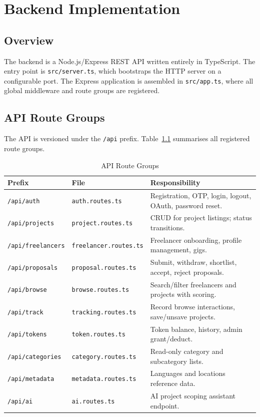 \chapter{Backend Implementation}

\section{Overview}

The \projectname{} backend is a Node.js/Express REST API written entirely in TypeScript. The entry point is \texttt{src/server.ts}, which bootstraps the HTTP server on a configurable port. The Express application is assembled in \texttt{src/app.ts}, where all global middleware and route groups are registered.

\section{API Route Groups}

The API is versioned under the \texttt{/api} prefix. Table~\ref{tab:routes} summarises all registered route groups.

\begin{table}[H]
\centering
\caption{API Route Groups}
\label{tab:routes}
\begin{tabularx}{\textwidth}{llX}
\toprule
\textbf{Prefix} & \textbf{File} & \textbf{Responsibility} \\
\midrule
\texttt{/api/auth}        & \texttt{auth.routes.ts}        & Registration, OTP, login, logout, OAuth, password reset. \\
\texttt{/api/projects}    & \texttt{project.routes.ts}     & CRUD for project listings; status transitions. \\
\texttt{/api/freelancers} & \texttt{freelancer.routes.ts}  & Freelancer onboarding, profile management, gigs. \\
\texttt{/api/proposals}   & \texttt{proposal.routes.ts}    & Submit, withdraw, shortlist, accept, reject proposals. \\
\texttt{/api/browse}      & \texttt{browse.routes.ts}      & Search/filter freelancers and projects with scoring. \\
\texttt{/api/track}       & \texttt{tracking.routes.ts}    & Record browse interactions, save/unsave projects. \\
\texttt{/api/tokens}      & \texttt{token.routes.ts}       & Token balance, history, admin grant/deduct. \\
\texttt{/api/categories}  & \texttt{category.routes.ts}    & Read-only category and subcategory lists. \\
\texttt{/api/metadata}    & \texttt{metadata.routes.ts}    & Languages and locations reference data. \\
\texttt{/api/ai}          & \texttt{ai.routes.ts}          & AI project scoping assistant endpoint. \\
\bottomrule
\end{tabularx}
\end{table}

